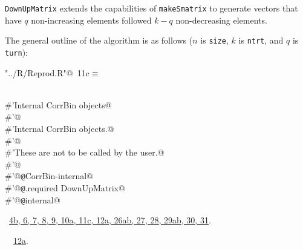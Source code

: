 \documentclass[reqno]{amsart}
\renewcommand{\NWtarget}[2]{\hypertarget{#1}{#2}}
\renewcommand{\NWlink}[2]{\hyperlink{#1}{#2}}
\begin{document}
\texttt{DownUpMatrix} extends the capabilities of \texttt{makeSmatrix} to generate
vectors that have $q$ non-increasing elements followed $k-q$ non-decreasing
elements.

The general outline of the algorithm is as follows ($n$ is \texttt{size}, 
$k$ is \texttt{ntrt}, and $q$ is \texttt{turn}):
\begin{flushleft} \small\label{scrap15}\raggedright\small
\NWtarget{nuweb11c}{} \verb@"../R/Reprod.R"@\nobreak\ {\footnotesize {11c}}$\equiv$
\vspace{-1ex}
\begin{list}{}{} \item
\mbox{}\verb@@\\
\mbox{}\verb@#'Internal CorrBin objects@\\
\mbox{}\verb@#'@\\
\mbox{}\verb@#'Internal CorrBin objects.@\\
\mbox{}\verb@#'@\\
\mbox{}\verb@#'These are not to be called by the user.@\\
\mbox{}\verb@#'@\\
\mbox{}\verb@#'@{\tt @}\verb@rdname CorrBin-internal@\\
\mbox{}\verb@#'@{\tt @}\verb@aliases .required DownUpMatrix@\\
\mbox{}\verb@#'@{\tt @}\verb@keywords internal@\\
\mbox{}\verb@@{\NWsep}
\end{list}
\vspace{-1.5ex}
\footnotesize
\begin{list}{}{\setlength{\itemsep}{-\parsep}\setlength{\itemindent}{-\leftmargin}}
\item \NWtxtFileDefBy\ \NWlink{nuweb4b}{4b}\NWlink{nuweb6}{, 6}\NWlink{nuweb7}{, 7}\NWlink{nuweb8}{, 8}\NWlink{nuweb9}{, 9}\NWlink{nuweb10a}{, 10a}\NWlink{nuweb11c}{, 11c}\NWlink{nuweb12a}{, 12a}\NWlink{nuweb26a}{, 26a}\NWlink{nuweb26b}{b}\NWlink{nuweb27}{, 27}\NWlink{nuweb28}{, 28}\NWlink{nuweb29a}{, 29a}\NWlink{nuweb29b}{b}\NWlink{nuweb30}{, 30}\NWlink{nuweb31}{, 31}.
\item \NWtxtIdentsUsed\nobreak\  \verb@DownUpMatrix@\nobreak\ \NWlink{nuweb12a}{12a}.
\item{}
\end{list}
\vspace{4ex}
\end{flushleft}
\end{document}
